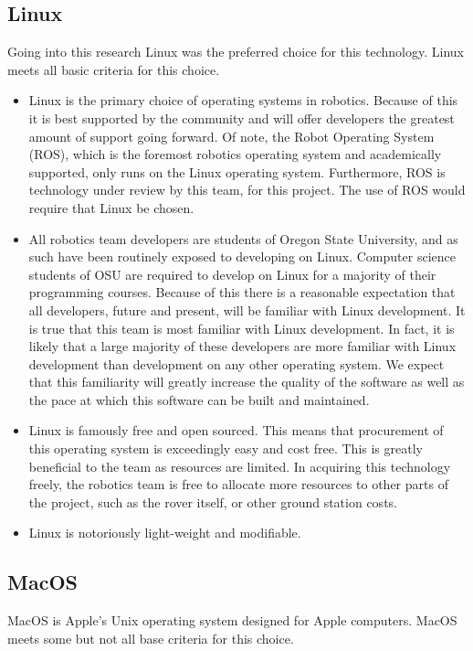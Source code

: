 \documentclass[onecolumn, draftclsnofoot, 10pt, compsoc]{IEEEtran}
\begin{document}
\subsection{Linux}
Going into this research Linux was the preferred choice for this technology.
Linux meets all basic criteria for this choice.
\begin{itemize}
\item 
Linux is the primary choice of operating systems in robotics. 
Because of this it is best supported by the community and will offer developers the greatest amount of support going forward.
Of note, the Robot Operating System (ROS), which is the foremost robotics operating system and academically supported, only runs on the Linux operating system.
Furthermore, ROS is technology under review by this team, for this project.
The use of ROS would require that Linux be chosen.

\item 
All robotics team developers are students of Oregon State University, and as such have been routinely exposed to developing on Linux.
Computer science students of OSU are required to develop on Linux for a majority of their programming courses.
Because of this there is a reasonable expectation that all developers, future and present, will be familiar with Linux development.
It is true that this team is most familiar with Linux development.
In fact, it is likely that a large majority of these developers are more familiar with Linux development than development on any other operating system.
We expect that this familiarity will greatly increase the quality of the software as well as the pace at which this software can be built and maintained.

\item
Linux is famously free and open sourced.
This means that procurement of this operating system is exceedingly easy and cost free.
This is greatly beneficial to the team as resources are limited.
In acquiring this technology freely, the robotics team is free to allocate more resources to other parts of the project, such as the rover itself, or other ground station costs.

\item
Linux is notoriously light-weight and modifiable. 

\end{itemize}


\subsection{MacOS}
MacOS is Apple's Unix operating system designed for Apple computers.
MacOS meets some but not all base criteria for this choice.
\end{document}
